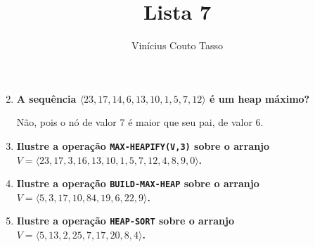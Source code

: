 \documentclass{article}
\title{Lista 7}
\author{Vinícius Couto Tasso}
\date{}
\begin{document}
\maketitle
   
         
\begin{enumerate}

\setcounter{enumi}{1}

\item \textbf{A sequência $\langle 23, 17, 14, 6, 13, 10, 1, 5, 7, 12 \rangle$ é um heap máximo?}

Não, pois o nó de valor 7 é maior que seu pai, de valor 6.

\item \textbf{Ilustre a operação \texttt{MAX-HEAPIFY(V,3)} sobre o arranjo $V = \langle 23, 17, 3, 16, 13, 10, 1, 5, 7, 12, 4, 8, 9, 0 \rangle$.}



\newpage

\item \textbf{Ilustre a operação \texttt{BUILD-MAX-HEAP} sobre o arranjo $V = \langle 5, 3, 17, 10, 84, 19, 6, 22, 9 \rangle$.}



\item \textbf{Ilustre a operação \texttt{HEAP-SORT} sobre o arranjo $V = \langle 5, 13, 2, 25, 7, 17, 20, 8, 4 \rangle$.}



\end{enumerate}
\end{document}
